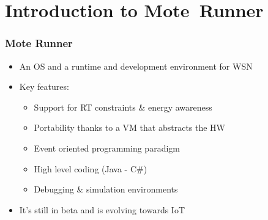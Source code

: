 \section{Introduction to \mbox{Mote Runner}}
\begin{frame}[fragile]
  \frametitle{Mote Runner}
  \begin{itemize}
    \item An OS and a runtime and development environment for WSN
    \item Key features:
    \begin{itemize}
      \item Support for RT constraints \& energy awareness
      \item Portability thanks to a VM that abstracts the HW
      \item Event oriented programming paradigm
      \item High level coding (Java - C\#)
      \item Debugging \& simulation environments
    \end{itemize}
    \item It’s still in beta and is evolving towards IoT
  \end{itemize}
\end{frame}

